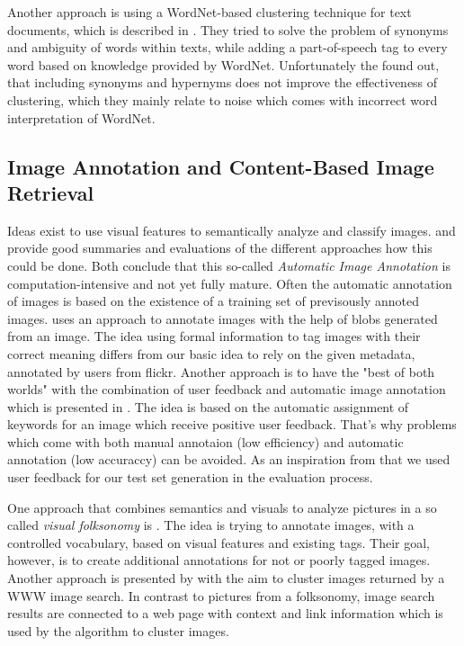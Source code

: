 Another approach is using a WordNet-based clustering technique for text documents, which is described in \cite{sedding2004wordnet}.  They tried to solve the problem of synonyms and ambiguity of words within texts, while adding a part-of-speech tag to every word based on knowledge provided by WordNet. Unfortunately the found out, that including synonyms and hypernyms does not improve the effectiveness of clustering, which they mainly relate to noise which comes with incorrect word interpretation of WordNet. 

\subsection{Image Annotation and Content-Based Image Retrieval}

Ideas exist to use visual features to semantically analyze and classify images. \cite{Liu2007} and \cite{Zhang2012} provide good summaries and evaluations of the different approaches how this could be done. Both conclude that this so-called \emph{Automatic Image Annotation}  is computation-intensive and not yet fully mature.
Often the automatic annotation of images is based on the existence of a training set of previsously annoted images.  \cite{jeon2003automatic}	uses an approach to annotate images with the help of blobs generated from an image. The idea using formal information to tag images with their correct meaning differs from our basic idea to rely on the given metadata, annotated by users from flickr.
Another approach is to have the "best of both worlds" with the combination of user feedback and automatic image annotation which is presented  in \cite{wenyin2001semi}. The idea is based on the automatic assignment of keywords for an image which receive positive user feedback. That's why problems which come with both manual annotaion (low efficiency) and automatic annotation (low accuraccy) can be avoided. As an inspiration from that we used user feedback for our test set generation in the evaluation process.
	
\bigskip

One approach that combines semantics and visuals to analyze pictures in a so called \emph{visual folksonomy} is \cite{Lindstaedt2009}. The idea is trying to annotate images, with a controlled vocabulary, based on visual features and existing tags. Their goal, however, is to create additional annotations for not or poorly tagged images. \\
Another approach is presented by \cite{cai2004hierarchical} with the aim to cluster images returned by a WWW image search. In contrast to pictures from a folksonomy, image search results are connected to a web page with context and link information which is used by the algorithm to cluster images.
